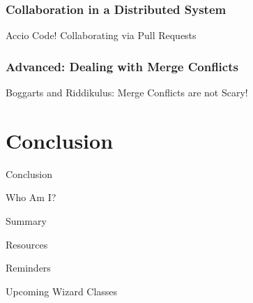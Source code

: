 \documentclass{beamer}
\theoremstyle{example}
\begin{document}
\section{Collaboration in a Distributed System}
\begin{frame}{Accio Code! Collaborating via Pull Requests}
\end{frame}

\section{Advanced: Dealing with Merge Conflicts}
\begin{frame}{Boggarts and Riddikulus: Merge Conflicts are \alert{not} Scary!}
\end{frame}

\part{Conclusion}
\begin{frame}{Conclusion}
    \begin{block}{Who Am I?}
    \end{block}
    \begin{block}{Summary}
    \end{block}
    \begin{block}{Resources}
    \end{block}
    \begin{block}{Reminders}
    \end{block}
    \begin{block}{Upcoming Wizard Classes}
    \end{block}
\end{frame}

\end{document}
